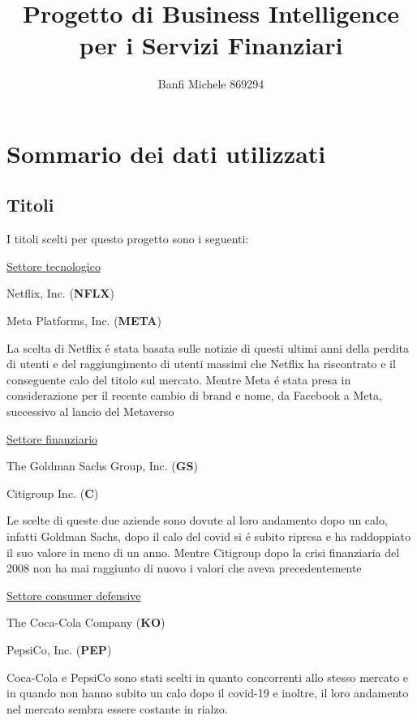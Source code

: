 \documentclass{report}
\title{Progetto di Business Intelligence per i Servizi Finanziari}
\author{Banfi Michele 869294}
\begin{document}
\maketitle

\chapter{Sommario dei dati utilizzati}
\section{Titoli}
I titoli scelti per questo progetto sono i seguenti:

\noindent \underline{Settore tecnologico}

Netflix, Inc. (\textbf{NFLX})

Meta Platforms, Inc. (\textbf{META})

\noindent La scelta di Netflix é stata basata sulle notizie di questi ultimi anni della perdita di utenti e del raggiungimento di utenti massimi che Netflix ha riscontrato e il conseguente calo del titolo sul mercato. Mentre Meta é stata presa in considerazione per il recente cambio di brand e nome, da Facebook a Meta, successivo al lancio del Metaverso

\noindent \underline{Settore finanziario}

The Goldman Sachs Group, Inc. (\textbf{GS})

Citigroup Inc. (\textbf{C})

\noindent Le scelte di queste due aziende sono dovute al loro andamento dopo un calo, infatti Goldman Sachs, dopo il calo del covid si é subito ripresa e ha raddoppiato il suo valore in meno di un anno. Mentre Citigroup dopo la crisi finanziaria del 2008 non ha mai raggiunto di nuovo i valori che aveva precedentemente

\noindent \underline{Settore consumer defensive}

The Coca-Cola Company (\textbf{KO})

PepsiCo, Inc. (\textbf{PEP})

Coca-Cola e PepsiCo sono stati scelti in quanto concorrenti allo stesso mercato e in quando non hanno subito un calo dopo il covid-19 e inoltre, il loro andamento nel mercato sembra essere costante in rialzo.
\end{document}
